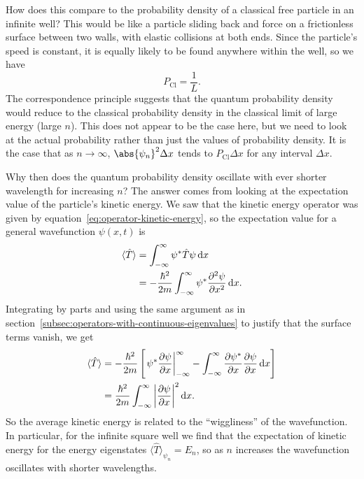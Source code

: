 \documentclass[../quantum_mechanics.tex]{subfiles}
\begin{document}
            How does this compare to the probability density of a classical free particle in an infinite well?
            This would be like a particle sliding back and force on a frictionless surface between two walls, with elastic collisions at both ends.
            Since the particle's speed is constant, it is equally likely to be found anywhere within the well, so we have
            \begin{equation}
                P_\text{Cl}=\frac{1}{L}.
            \end{equation}
            The correspondence principle suggests that the quantum probability density would reduce to the classical probability density in the classical limit of large energy (large $n$).
            This does not appear to be the case here, but we need to look at the actual probability rather than just the values of probability density.
            It is the case that as $n\to\infty$, $\abs{\psi_n}^2\Delta x$ tends to $P_\text{Cl}\Delta x$ for any interval $\Delta x$.
            
            Why then does the quantum probability density oscillate with ever shorter wavelength for increasing $n$?
            The answer comes from looking at the expectation value of the particle's kinetic energy.
            We saw that the kinetic energy operator was given by equation~\ref{eq:operator-kinetic-energy}, so the expectation value for a general wavefunction $\psi(x,t)$ is
            \begin{align}
                \langle\hat{T}\rangle&=\int_{-\infty}^\infty\psi^\ast\hat{T}\psi\dd{x}\\
                &=-\frac{\hbar^2}{2m}\int_{-\infty}^\infty\psi^\ast\pdv[2]{\psi}{x}\dd{x}.
            \end{align}
            Integrating by parts and using the same argument as in section~\ref{subsec:operators-with-continuous-eigenvalues} to justify that the surface terms vanish, we get
            \begin{align}
                \langle\hat{T}\rangle&=-\frac{\hbar^2}{2m}\left[\left.\psi^\ast\pdv{\psi}{x}\right|_{-\infty}^\infty-\int_{-\infty}^\infty\pdv{\psi^\ast}{x}\pdv{\psi}{x}\dd{x}\right]\\
                &=\frac{\hbar^2}{2m}\int_{-\infty}^\infty\left|\pdv{\psi}{x}\right|^2\dd{x}.
            \end{align}
            So the average kinetic energy is related to the ``wiggliness'' of the wavefunction.
            In particular, for the infinite square well we find that the expectation of kinetic energy for the energy eigenstates $\langle\hat{T}\rangle_{\psi_n}=E_n$, so as $n$ increases the wavefunction oscillates with shorter wavelengths.
    
\end{document}
